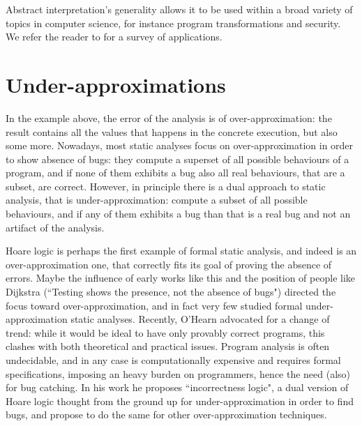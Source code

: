 Abstract interpretation's generality allows it to be used within a broad variety of topics in computer science, for instance program transformations and security. We refer the reader to \cite{cousot-absint-survey} for a survey of applications.

\section{Under-approximations}
In the example above, the error of the analysis is of over-approximation: the result contains all the values that happens in the concrete execution, but also some more.
Nowadays, most static analyses focus on over-approximation in order to show absence of bugs: they compute a superset of all possible behaviours of a program, and if none of them exhibits a bug also all real behaviours, that are a subset, are correct. However, in principle there is a dual approach to static analysis, that is under-approximation: compute a subset of all possible behaviours, and if any of them exhibits a bug than that is a real bug and not an artifact of the analysis.

Hoare logic \cite{hoare-logic} is perhaps the first example of formal static analysis, and indeed is an over-approximation one, that correctly fits its goal of proving the absence of errors. Maybe the influence of early works like this and the position of people like Dijkstra (``Testing shows the presence, not the absence of bugs") directed the focus toward over-approximation, and in fact very few studied formal under-approximation static analyses.
Recently, O'Hearn \cite{ohearn-incorrectness-logic} advocated for a change of trend: while it would be ideal to have only provably correct programs, this clashes with both theoretical and practical issues. Program analysis is often undecidable, and in any case is computationally expensive and requires formal specifications, imposing an heavy burden on programmers, hence the need (also) for bug catching. In his work he proposes ``incorrectness logic", a dual version of Hoare logic thought from the ground up for under-approximation in order to find bugs, and propose to do the same for other over-approximation techniques.


